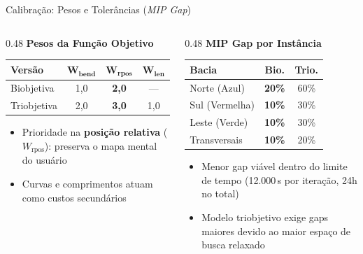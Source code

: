\documentclass{beamer}
\begin{document}
\begin{frame}{Calibração: Pesos e Tolerâncias (\textit{MIP Gap})}
  \begin{columns}[T]
    \begin{column}{0.48\textwidth}
      \textbf{Pesos da Função Objetivo}
      \vspace{0.15cm}
      
      \centering
      \small
      \begin{tabular}{lccc}
        \toprule
        \textbf{Versão} & $\boldsymbol{W_{\text{bend}}}$ & $\boldsymbol{W_{\text{rpos}}}$ & $\boldsymbol{W_{\text{len}}}$ \\
        \midrule
        Biobjetiva  & 1,0 & \textbf{2,0} & --- \\
        Triobjetiva & 2,0 & \textbf{3,0} & 1,0 \\
        \bottomrule
      \end{tabular}

      \vspace{0.25cm}
      \raggedright
      \footnotesize
      \begin{itemize}
        \item Prioridade na \textbf{posição relativa} ($W_{\text{rpos}}$): preserva o mapa mental do usuário
        \item Curvas e comprimentos atuam como custos secundários
      \end{itemize}
    \end{column}

    \begin{column}{0.48\textwidth}
      \textbf{MIP Gap por Instância}
      \vspace{0.15cm}

      \centering
      \small
      \begin{tabular}{lcc}
        \toprule
        \textbf{Bacia} & \textbf{Bio.} & \textbf{Trio.} \\
        \midrule
        Norte (Azul)       & \textbf{20\%} & 60\% \\
        Sul (Vermelha)     & \textbf{10\%} & 30\% \\
        Leste (Verde)      & \textbf{10\%} & 30\% \\
        Transversais       & \textbf{10\%} & 20\% \\
        \bottomrule
      \end{tabular}

      \vspace{0.25cm}
      \raggedright
      \footnotesize
      \begin{itemize}
        \item Menor gap viável dentro do limite de tempo (12.000\,s por iteração, 24h no total)
        \item Modelo triobjetivo exige gaps maiores devido ao maior espaço de busca relaxado
      \end{itemize}
    \end{column}
  \end{columns}
\end{frame}
\end{document}
